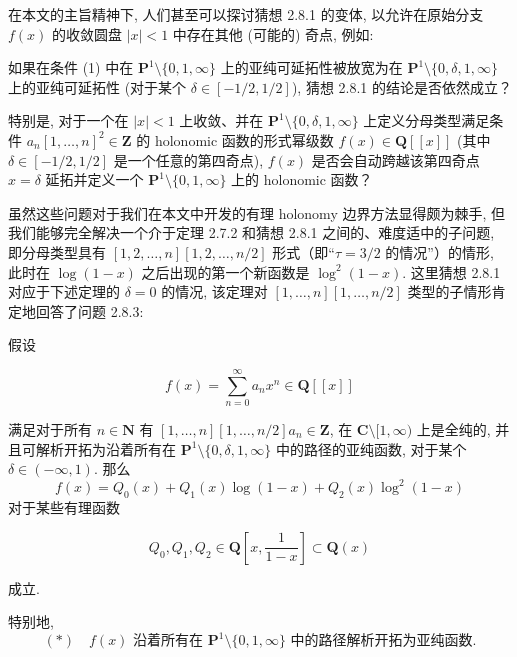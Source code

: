 在本文的主旨精神下, 人们甚至可以探讨猜想 2.8.1 的变体, 以允许在原始分支 \(f(x)\) 的收敛圆盘 \(|x| < 1\) 中存在其他 (可能的) 奇点, 例如:

\begin{question}\label{qu:2.8.3}
如果在条件 (1) 中在 \(\mathbf{P}^1 \setminus \{0,1,\infty\}\) 上的亚纯可延拓性被放宽为在 \(\mathbf{P}^1 \setminus \{0,\delta,1,\infty\}\) 上的亚纯可延拓性 (对于某个 \(\delta \in [-1/2,1/2]\)), 猜想 2.8.1 的结论是否依然成立？

特别是, 对于一个在 \(|x| < 1\) 上收敛、并在 \(\mathbf{P}^1 \setminus \{0,\delta,1,\infty\}\) 上定义分母类型满足条件 \(a_n[1, \dots, n]^2 \in \mathbf{Z}\) 的 holonomic 函数的形式幂级数 \(f(x) \in \mathbf{Q}[\![x]\!]\) (其中 \(\delta \in [-1/2, 1/2]\) 是一个任意的第四奇点), \(f(x)\) 是否会自动跨越该第四奇点 \(x = \delta\) 延拓并定义一个 \(\mathbf{P}^1 \setminus \{0, 1, \infty\}\) 上的 holonomic 函数？
\end{question}

虽然这些问题对于我们在本文中开发的有理 holonomy 边界方法显得颇为棘手, 但我们能够完全解决一个介于定理 2.7.2 和猜想 2.8.1 之间的、难度适中的子问题, 即分母类型具有 \([1,2,\dots,n][1,2,\dots,n/2]\) 形式（即“\(\tau=3/2\) 的情况”）的情形, 此时在 \(\log(1-x)\) 之后出现的第一个新函数是 \(\log^2(1-x)\). 这里猜想 2.8.1 对应于下述定理的 \(\delta=0\) 的情况, 该定理对 \([1,\dots,n][1,\dots,n/2]\) 类型的子情形肯定地回答了问题 2.8.3:

\begin{theorem}\label{thm:2.8.4}
假设 

\[f(x) = \sum_{n=0}^{\infty} a_n x^n \in \mathbf{Q}[\! [x]\!]\] 

满足对于所有 \(n \in \mathbf{N}\) 有 \([1,\dots,n][1,\dots,n/2]a_n \in \mathbf{Z}\), 在 \(\mathbf{C} \setminus [1,\infty)\) 上是全纯的, 并且可解析开拓为沿着所有在 \(\mathbf{P}^1 \setminus \{0,\delta,1,\infty\}\) 中的路径的亚纯函数, 对于某个 \(\delta \in (-\infty,1)\). 那么
\begin{equation}\label{eq:2.8.5}
  f(x) = Q_0(x) + Q_1(x)\log(1-x) + Q_2(x)\log^2(1-x)
\end{equation}
对于某些有理函数 

\begin{equation*}
Q_0, Q_1, Q_2 \in \mathbf{Q}\left[x, \frac{1}{1-x}\right] \subset \mathbf{Q}(x)
\end{equation*}

成立. 

特别地,
\[ (*) \quad f(x) \text{ 沿着所有在 } \mathbf{P}^1 \setminus \{0, 1, \infty\} \text{ 中的路径解析开拓为亚纯函数.} \]
\end{theorem}

